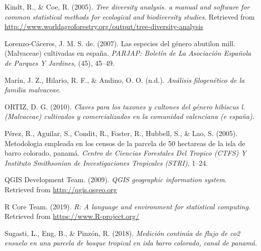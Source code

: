\documentclass[11pt,]{article}
\begin{document}
\hypertarget{ref-biodiversidad}{}
Kindt, R., \& Coe, R. (2005). \emph{Tree diversity analysis. a manual
and software for common statistical methods for ecological and
biodiversity studies}. Retrieved from
\url{http://www.worldagroforestry.org/output/tree-diversity-analysis}

\hypertarget{ref-de2007especies}{}
Lorenzo-Cáceres, J. M. S. de. (2007). Las especies del género abutilon
mill.(Malvaceae) cultivadas en españa. \emph{PARJAP: Boletín de La
Asociación Española de Parques Y Jardines}, (45), 45--49.

\hypertarget{ref-marinanalisis}{}
Marín, J. Z., Hilario, R. F., \& Andino, O. O. (n.d.). \emph{Análisis
filogenético de la familia malvaceae}.

\hypertarget{ref-ortizclaves}{}
ORTIZ, D. G. (2010). \emph{Claves para los taxones y cultones del género
hibiscus l.(Malvaceae) cultivados y comercializados en la comunidad
valenciana (e españa)}.

\hypertarget{ref-perez2005metodologia}{}
Pérez, R., Aguilar, S., Condit, R., Foster, R., Hubbell, S., \& Lao, S.
(2005). Metodologia empleada en los censos de la parcela de 50 hectareas
de la isla de barro colorado, panamá. \emph{Centro de Ciencias
Forestales Del Tropico (CTFS) Y Instituto Smithsonian de Investigaciones
Tropicales (STRI)}, 1--24.

\hypertarget{ref-QGIS_software}{}
QGIS Development Team. (2009). \emph{QGIS geographic information
system}. Retrieved from \url{http://qgis.osgeo.org}

\hypertarget{ref-R}{}
R Core Team. (2019). \emph{R: A language and environment for statistical
computing}. Retrieved from \url{https://www.R-project.org/}

\hypertarget{ref-sugastimedicion}{}
Sugasti, L., Eng, B., \& Pinzón, R. (2018). \emph{Medición continúa de
flujo de co2 ensuelo en una parcela de bosque tropical en isla barro
colorado, canal de panamá.}




\newpage
\singlespacing 
\end{document}
